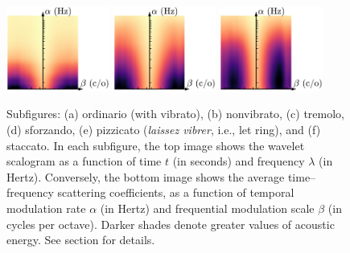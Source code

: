\documentclass{bmcart}
\newcommand{\lnameref}[1]{%
\bgroup
\let\nmu\MakeLowercase
\nameref{#1}\egroup}
\newcommand{\nmu}{}
\begin{document}
\begin{backmatter}
\begin{figure}
\hspace{2mm}
\includegraphics[height=28mm]{figures/violin_scattering/Vn-sfz-C4-fp-4c_scattering.pdf}
\hspace{5mm}
\includegraphics[height=28mm]{figures/violin_scattering/Vn-pizz-lv-C4-pp-4c_scattering.pdf}
\hspace{5mm}
\includegraphics[trim=0 0 77 0, clip, height=28mm]{figures/violin_scattering/Vn-stacc-C4-mf_scattering.pdf}


\hspace{2mm}
\hspace{25mm}
\hspace{25mm}
\hspace{1mm}


\caption{
Subfigures:
(a) ordinario (with vibrato), (b) nonvibrato, (c) tremolo, (d) sforzando, (e) pizzicato (\emph{laissez vibrer}, i.e., let ring), and (f) staccato.
In each subfigure, the top image shows the wavelet scalogram as a function of time $t$ (in seconds) and frequency $\lambda$ (in Hertz).
Conversely, the bottom image shows the average time--frequency scattering coefficients, as a function of temporal modulation rate $\alpha$ (in Hertz) and frequential modulation scale $\beta$ (in cycles per octave).
Darker shades denote greater values of acoustic energy.
See \lnameref{sec:methods} section for details.}
\label{fig:violin-scattering}
\end{figure}





\end{backmatter}
\end{document}
